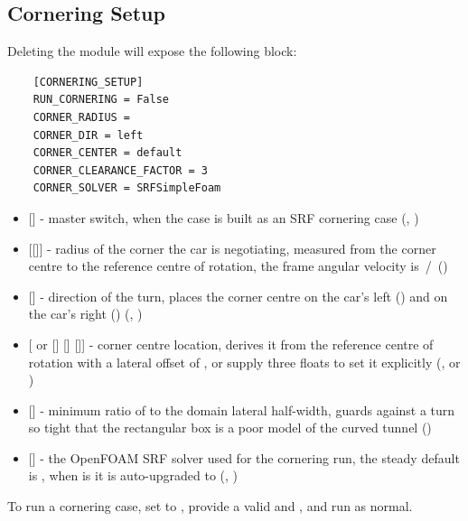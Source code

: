 \subsection{Cornering Setup}
Deleting the module  will expose the following block:
\begin{lstlisting}
    [CORNERING_SETUP]
    RUN_CORNERING = False
    CORNER_RADIUS =
    CORNER_DIR = left
    CORNER_CENTER = default
    CORNER_CLEARANCE_FACTOR = 3
    CORNER_SOLVER = SRFSimpleFoam
\end{lstlisting}
\begin{itemize}
    \item {} [] - master switch, when  the case is built as an SRF cornering case (, )

    \item {} [[]] - radius of the corner the car is negotiating, measured from the corner centre to the reference centre of rotation, the frame angular velocity is \,/\, ()

    \item {} [] - direction of the turn,  places the corner centre on the car's left () and  on the car's right () (, )

    \item {} [ or [] [] []] - corner centre location,  derives it from the reference centre of rotation with a lateral offset of , or supply three floats to set it explicitly (, or   )

    \item {} [] - minimum ratio of  to the domain lateral half-width, guards against a turn so tight that the rectangular box is a poor model of the curved tunnel ()

    \item {} [] - the OpenFOAM SRF solver used for the cornering run, the steady default is , when  is  it is auto-upgraded to  (, )
\end{itemize}
To run a cornering case, set  to , provide a valid  and , and run  as normal.

